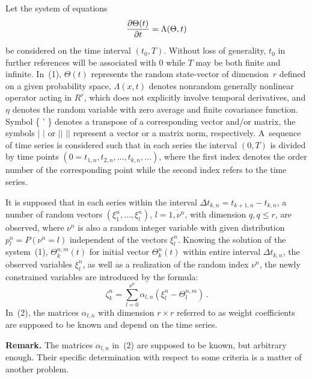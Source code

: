 \begin{multicols}{2}
\noindent
Let the system of equations
\begin{equation}
\displaystyle\frac{\displaystyle \partial{\Theta (t)}\mathstrut}{\displaystyle \partial t\mathstrut} = \Lambda (\Theta,t) 
\label{e1-b}
\end{equation}
be considered on the time interval $(t_0,T)$. Without loss of generality, $t_0$ in further 
references will be associated with $0$ while $T$ may be both finite and infinite. In~(1),
$\Theta (t)$ represents the random state-vector of dimension~$r$ defined on a given probability 
space, $\Lambda (x,t)$ denotes nonrandom generally nonlinear operator acting in $R^r$,  which 
does not explicitly involve temporal derivatives, and $\eta$ denotes the random variable with 
zero average and finite covariance function.
Symbol \{ ' \} denotes a transpose of a corresponding vector and/or matrix, 
the symbols $|$  $|$ or $||$  $||$ represent a vector or a matrix norm, respectively. 
A~sequence of time series is considered such that in each series the interval $(0,T)$ 
is divided by time points $(0=t_{1,n}, t_{2,n}, \dots, t_{k,n}, \dots)$, where the 
first index denotes the order number of the corresponding point while the second index 
refers to the time series. 

It is supposed that in each series within the interval 
$\Delta t_{k,n}=t_{k+1,n}-t_{k,n}$, a number of random vectors $(\xi^n_1, \dots, \xi^n_l)$, 
$l=\overline{1,\nu^n}$, with dimension $q, q\leq r$, are observed, where $\nu^n$  is also a random integer 
variable with given distribution $p^n_l=P(\nu^n=l)$ independent of the vectors $\xi^n_l$. 
Knowing the solution of the system~(1), $\Theta^{n,m}_k(t)$ for initial vector $\Theta^{n}_k(t)$ 
within entire interval $\Delta t_{k,n}$, the observed variables  $\xi^n_l$, as well as a 
realization of the random index $\nu^n$, the newly constrained variables are introduced 
by the  formula:
\begin{equation}
\zeta^n_k = \sum\limits^{\nu^n}_{l=0} \alpha_{l,n}(\xi^n_l-\Theta^{n,m}_l)\,.
\label{e2-b}
\end{equation}
In~(2), the matrices $\alpha_{l,n}$ with dimension $r \times r$ referred to as weight 
coefficients are supposed to be known and depend on the time series.

\smallskip

\noindent
\textbf{Remark.} The matrices $\alpha_{l,n}$ in~(2) are supposed to be known, but arbitrary 
enough. Their specific determination with respect to some criteria is a matter of another 
problem.

\smallskip


\end{multicols}
